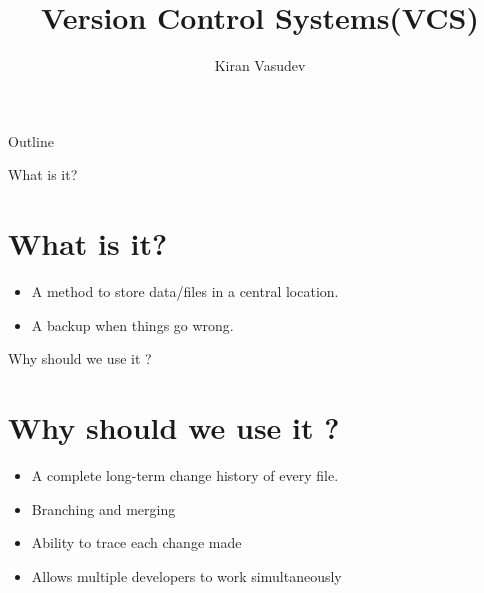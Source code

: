 \documentclass{beamer}
\title{Version Control Systems(VCS)}
\author{Kiran Vasudev\inst{1}}
\institute[Universities of Somewhere and Elsewhere] %
{
  \inst{1}%
  Hochschule Bonn-Rhein-Sieg
}
\begin{document}
\begin{frame}
  \titlepage
\end{frame}

\begin{frame}{Outline}
  \tableofcontents
\end{frame}

%

\begin{frame}{What is it?}%
\section{What is it?}
  \begin{itemize}
  \item {
    A method to store data/files in a central location.
  }
  \item {
    A backup when things go wrong.
  }
  \end{itemize}
\end{frame}


\begin{frame}{Why should we use it ?}
\section{Why should we use it ?}
  \begin{itemize}
  \item {
    A complete long-term change history of every file.
  }
  \item {   
    Branching and merging
  }
  \item {   
    Ability to trace each change made
  }
  \item {   
	Allows multiple developers to work simultaneously
  }
  \end{itemize}
\end{frame}
\end{document}
